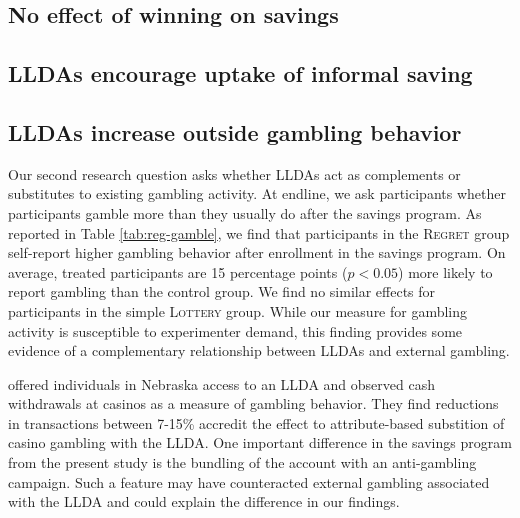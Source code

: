\documentclass[12pt]{article}
\begin{document}
	\subsection{No effect of winning on savings}


	\subsection{LLDAs encourage uptake of informal saving}


	\subsection{LLDAs increase outside gambling behavior}

		Our second research question asks whether LLDAs act as complements or substitutes to existing gambling activity. At endline, we ask participants whether participants gamble more than they usually do after the savings program. As reported in Table \ref{tab:reg-gamble}, we find that participants in the \textsc{Regret} group self-report higher gambling behavior after enrollment in the savings program. On average, treated participants are 15 percentage points ($p < 0.05$) more likely to report gambling than the control group. We find no similar effects for participants in the simple \textsc{Lottery} group. While our measure for gambling activity is susceptible to experimenter demand, this finding provides some evidence of a complementary relationship between LLDAs and external gambling.

		 offered individuals in Nebraska access to an LLDA and observed cash withdrawals at casinos as a measure of gambling behavior. They find reductions in transactions between 7-15\% accredit the effect to attribute-based substition of casino gambling with the LLDA. One important difference in the savings program from the present study is the bundling of the account with an anti-gambling campaign. Such a feature may have counteracted external gambling associated with the LLDA and could explain the difference in our findings.

\end{document}
